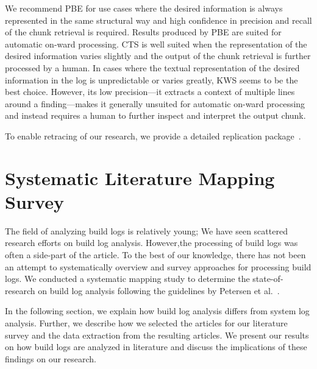 We recommend PBE for use cases where the desired information is always
represented in the same structural way and high confidence in
precision and recall of the chunk retrieval is required.
Results
produced by PBE are suited for automatic on-ward processing.
CTS is
well suited when the representation of the desired information varies
slightly and the output of the chunk retrieval is further processed by
a human.
In cases where the textual representation of the desired
information in the log is unpredictable or varies greatly, KWS seems
to be the best choice.
However, its low precision---it extracts a
context of multiple lines around a finding---makes it generally
unsuited for automatic on-ward processing and instead requires a human
to further inspect and interpret the output chunk.

To enable retracing of our research, we provide a detailed replication
package~\cite{brandt2020chunk-replication}.

\section{Systematic Literature Mapping Survey}
\label{sec:survey}

The field of analyzing build
logs is relatively young; We have seen scattered
research efforts on build log analysis.
However,the processing of build logs was often
a side-part of the article.
To the best of our
knowledge, there has not been an attempt to systematically overview
and survey approaches for processing build logs.
We conducted a systematic mapping study to determine the
state-of-research on build log analysis following the guidelines
by Petersen et al.~\cite{petersen2008systematic,petersen2015guidelines}.

In the following section, we explain how build log analysis differs
from system log analysis.
Further, we describe how we selected the articles for our literature
survey and the data extraction from the resulting articles.
We present our results on how build logs are analyzed in literature
and discuss the implications of these findings on our research.

